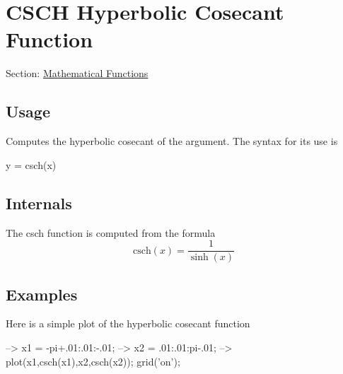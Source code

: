  \hypertarget{mathfunctions_csch}{}\section{C\-S\-C\-H Hyperbolic Cosecant Function}\label{mathfunctions_csch}
Section\-: \hyperlink{sec_mathfunctions}{Mathematical Functions} \hypertarget{vtkwidgets_vtkxyplotwidget_Usage}{}\subsection{Usage}\label{vtkwidgets_vtkxyplotwidget_Usage}
Computes the hyperbolic cosecant of the argument. The syntax for its use is \begin{DoxyVerb}   y = csch(x)
\end{DoxyVerb}
 \hypertarget{transforms_svd_Function}{}\subsection{Internals}\label{transforms_svd_Function}
The {\ttfamily csch} function is computed from the formula \[ \mathrm{csch}(x) = \frac{1}{\sinh(x)} \] \hypertarget{variables_matrix_Examples}{}\subsection{Examples}\label{variables_matrix_Examples}
Here is a simple plot of the hyperbolic cosecant function


\begin{DoxyVerbInclude}
--> x1 = -pi+.01:.01:-.01;
--> x2 = .01:.01:pi-.01;
--> plot(x1,csch(x1),x2,csch(x2)); grid('on');
\end{DoxyVerbInclude}


